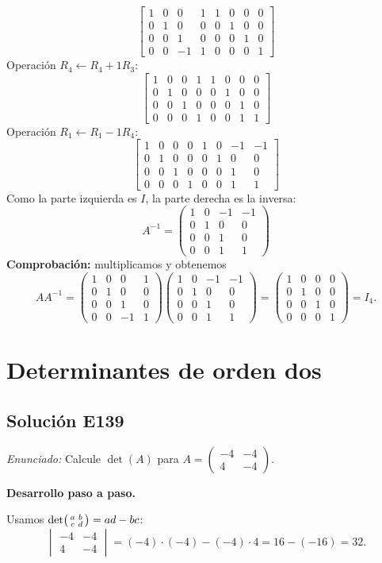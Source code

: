 \documentclass[12pt]{article}
\theoremstyle{remark}
\newcommand{\solucion}[2]{\Needspace{11\baselineskip}\subsection*{Solución E#1}\noindent\textit{Enunciado:} #2\par\medskip\noindent\textbf{Desarrollo paso a paso.}\par\medskip}
\begin{document}
\[
\left[\begin{array}{rrrr|rrrr}1&0&0&1&1&0&0&0\\0&1&0&0&0&1&0&0\\0&0&1&0&0&0&1&0\\0&0&-1&1&0&0&0&1\end{array}\right]
\]
Operación $R_{4}\leftarrow R_{4}+1R_{3}$:
\[
\left[\begin{array}{rrrr|rrrr}1&0&0&1&1&0&0&0\\0&1&0&0&0&1&0&0\\0&0&1&0&0&0&1&0\\0&0&0&1&0&0&1&1\end{array}\right]
\]
Operación $R_{1}\leftarrow R_{1}-1R_{4}$:
\[
\left[\begin{array}{rrrr|rrrr}1&0&0&0&1&0&-1&-1\\0&1&0&0&0&1&0&0\\0&0&1&0&0&0&1&0\\0&0&0&1&0&0&1&1\end{array}\right]
\]
Como la parte izquierda es $I$, la parte derecha es la inversa:
\[
\boxed{A^{-1}=\begin{pmatrix}1&0&-1&-1\\0&1&0&0\\0&0&1&0\\0&0&1&1\end{pmatrix}}
\]
\textbf{Comprobación:} multiplicamos y obtenemos
\[
AA^{-1}=\begin{pmatrix}1&0&0&1\\0&1&0&0\\0&0&1&0\\0&0&-1&1\end{pmatrix}\begin{pmatrix}1&0&-1&-1\\0&1&0&0\\0&0&1&0\\0&0&1&1\end{pmatrix}=\begin{pmatrix}1&0&0&0\\0&1&0&0\\0&0&1&0\\0&0&0&1\end{pmatrix}=I_{4}.
\]

\medskip

\section{Determinantes de orden dos}

\solucion{139}{Calcule $\det(A)$ para $A=\begin{pmatrix}-4&-4\\4&-4\end{pmatrix}$.}
Usamos $\det\begin{psmallmatrix}a&b\\c&d\end{psmallmatrix}=ad-bc$:
\[
\begin{vmatrix}-4&-4\\4&-4\end{vmatrix}=(-4)\cdot (-4)-(-4)\cdot 4=16-(-16)=32.
\]
\end{document}
